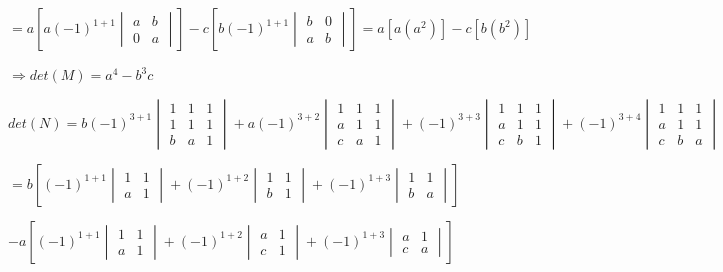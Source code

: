 \documentclass[fleqn]{article}
\begin{document}
\begin{enumerate}
      $=a\left[a(-1)^{1+1}
      \begin{vmatrix}
        a & b \\
        0 & a
      \end{vmatrix}\right]
      -c\left[b(-1)^{1+1}
      \begin{vmatrix}
        b & 0 \\
        a & b
      \end{vmatrix}\right]
      =a\left[a(a^2)\right]-c\left[b(b^2)\right]
      $

      $
      \Longrightarrow
      det(M)=a^4-b^3c
      $

      \bigbreak

      $
      det(N)=b(-1)^{3+1}
      \begin{vmatrix}
        1 & 1 & 1 \\
        1 & 1 & 1 \\
        b & a & 1
      \end{vmatrix}
      +a(-1)^{3+2}
      \begin{vmatrix}
        1 & 1 & 1 \\
        a & 1 & 1 \\
        c & a & 1
      \end{vmatrix}
      +(-1)^{3+3}
      \begin{vmatrix}
        1 & 1 & 1 \\
        a & 1 & 1 \\
        c & b & 1
      \end{vmatrix}
      +(-1)^{3+4}
      \begin{vmatrix}
        1 & 1 & 1 \\
        a & 1 & 1 \\
        c & b & a
      \end{vmatrix}
      $

      $=b\left[(-1)^{1+1}
      \begin{vmatrix}
        1 & 1 \\
        a & 1
      \end{vmatrix}
      +(-1)^{1+2}
      \begin{vmatrix}
        1 & 1 \\
        b & 1
      \end{vmatrix}
      +(-1)^{1+3}
      \begin{vmatrix}
        1 & 1 \\
        b & a 
      \end{vmatrix}
      \right]
      $

      $-a\left[(-1)^{1+1}
      \begin{vmatrix}
        1 & 1 \\
        a & 1
      \end{vmatrix}
      +(-1)^{1+2}
      \begin{vmatrix}
        a & 1 \\
        c & 1
      \end{vmatrix}
      +(-1)^{1+3}
      \begin{vmatrix}
        a & 1 \\
        c & a
      \end{vmatrix}
      \right]
      $


\end{enumerate}
\end{document}
